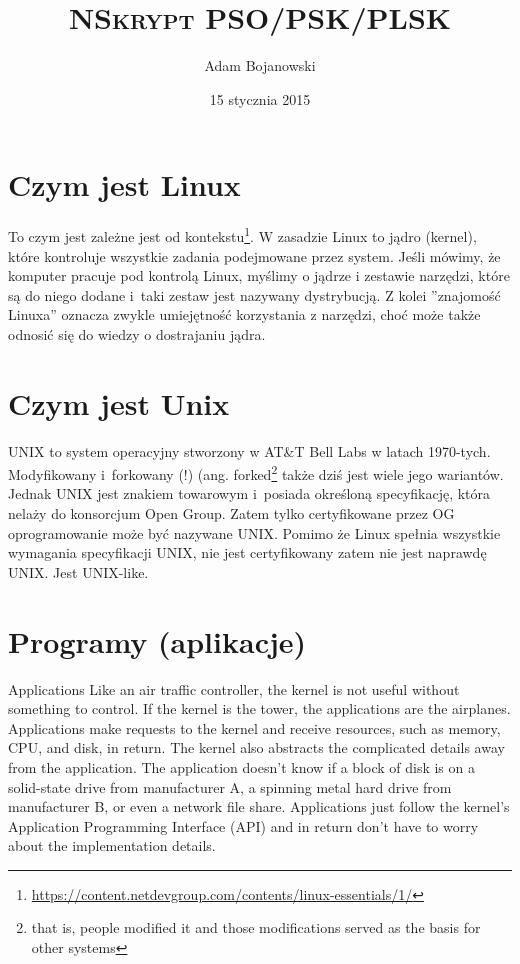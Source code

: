 \documentclass[a4paper,titlepage,12pt]{mwart}
\title{\textsc{\huge{NSkrypt PSO/PSK/PLSK}}}
\author{Adam Bojanowski}
\date{15 stycznia 2015}
\begin{document}
\graphicspath{ {/home/navegante/SLES/} }
\section{Czym jest Linux}

To czym jest zależne jest od kontekstu\footnote{\url{https://content.netdevgroup.com/contents/linux-essentials/1/}}. W zasadzie Linux to jądro (kernel), które kontroluje wszystkie zadania podejmowane przez system. Jeśli mówimy, że komputer pracuje pod kontrolą Linux, myślimy o jądrze i zestawie narzędzi, które są do niego dodane i~taki zestaw jest nazywany dystrybucją. Z kolei ''znajomość Linuxa'' oznacza zwykle umiejętność korzystania z narzędzi, choć może także odnosić się do wiedzy o dostrajaniu jądra.
\section{Czym jest Unix}
UNIX to system operacyjny stworzony w AT\&T Bell Labs w latach 1970-tych. Modyfikowany i~forkowany (!) (ang. forked\footnote{that is, people modified it and those modifications served as the basis for other systems} także dziś jest wiele jego wariantów. Jednak UNIX jest znakiem towarowym i~posiada określoną specyfikację, która nelaży do konsorcjum Open Group. Zatem tylko certyfikowane przez OG oprogramowanie może być nazywane UNIX. Pomimo że Linux spełnia wszystkie wymagania specyfikacji UNIX, nie jest certyfikowany zatem nie jest naprawdę UNIX. Jest UNIX-like.
\section{Programy (aplikacje)}
Applications
Like an air traffic controller, the kernel is not useful without something to control. If the kernel is the tower, the applications are the airplanes. Applications make requests to the kernel and receive resources, such as memory, CPU, and disk, in return. The kernel also abstracts the complicated details away from the application. The application doesn’t know if a block of disk is on a solid-state drive from manufacturer A, a spinning metal hard drive from manufacturer B, or even a network file share. Applications just follow the kernel’s Application Programming Interface (API) and in return don’t have to worry about the implementation details.
\end{document}

